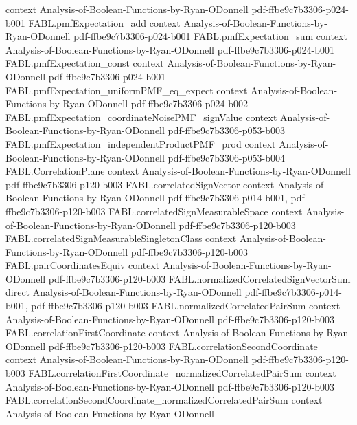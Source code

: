 \begin{theorem}
  {context}
  {Analysis-of-Boolean-Functions-by-Ryan-ODonnell}
  {pdf-ffbe9c7b3306-p024-b001}
\proofstep
  {FABL.pmfExpectation_add}
  {context}
  {Analysis-of-Boolean-Functions-by-Ryan-ODonnell}
  {pdf-ffbe9c7b3306-p024-b001}
\proofstep
  {FABL.pmfExpectation_sum}
  {context}
  {Analysis-of-Boolean-Functions-by-Ryan-ODonnell}
  {pdf-ffbe9c7b3306-p024-b001}
\proofstep
  {FABL.pmfExpectation_const}
  {context}
  {Analysis-of-Boolean-Functions-by-Ryan-ODonnell}
  {pdf-ffbe9c7b3306-p024-b001}
\proofstep
  {FABL.pmfExpectation_uniformPMF_eq_expect}
  {context}
  {Analysis-of-Boolean-Functions-by-Ryan-ODonnell}
  {pdf-ffbe9c7b3306-p024-b002}
\proofstep
  {FABL.pmfExpectation_coordinateNoisePMF_signValue}
  {context}
  {Analysis-of-Boolean-Functions-by-Ryan-ODonnell}
  {pdf-ffbe9c7b3306-p053-b003}
\proofstep
  {FABL.pmfExpectation_independentProductPMF_prod}
  {context}
  {Analysis-of-Boolean-Functions-by-Ryan-ODonnell}
  {pdf-ffbe9c7b3306-p053-b004}
\proofstep
  {FABL.CorrelationPlane}
  {context}
  {Analysis-of-Boolean-Functions-by-Ryan-ODonnell}
  {pdf-ffbe9c7b3306-p120-b003}
\proofstep
  {FABL.correlatedSignVector}
  {context}
  {Analysis-of-Boolean-Functions-by-Ryan-ODonnell}
  {pdf-ffbe9c7b3306-p014-b001,
    pdf-ffbe9c7b3306-p120-b003}
\proofstep
  {FABL.correlatedSignMeasurableSpace}
  {context}
  {Analysis-of-Boolean-Functions-by-Ryan-ODonnell}
  {pdf-ffbe9c7b3306-p120-b003}
\proofstep
  {FABL.correlatedSignMeasurableSingletonClass}
  {context}
  {Analysis-of-Boolean-Functions-by-Ryan-ODonnell}
  {pdf-ffbe9c7b3306-p120-b003}
\proofstep
  {FABL.pairCoordinatesEquiv}
  {context}
  {Analysis-of-Boolean-Functions-by-Ryan-ODonnell}
  {pdf-ffbe9c7b3306-p120-b003}
\proofstep
  {FABL.normalizedCorrelatedSignVectorSum}
  {direct}
  {Analysis-of-Boolean-Functions-by-Ryan-ODonnell}
  {pdf-ffbe9c7b3306-p014-b001,
    pdf-ffbe9c7b3306-p120-b003}
\proofstep
  {FABL.normalizedCorrelatedPairSum}
  {context}
  {Analysis-of-Boolean-Functions-by-Ryan-ODonnell}
  {pdf-ffbe9c7b3306-p120-b003}
\proofstep
  {FABL.correlationFirstCoordinate}
  {context}
  {Analysis-of-Boolean-Functions-by-Ryan-ODonnell}
  {pdf-ffbe9c7b3306-p120-b003}
\proofstep
  {FABL.correlationSecondCoordinate}
  {context}
  {Analysis-of-Boolean-Functions-by-Ryan-ODonnell}
  {pdf-ffbe9c7b3306-p120-b003}
\proofstep
  {FABL.correlationFirstCoordinate_normalizedCorrelatedPairSum}
  {context}
  {Analysis-of-Boolean-Functions-by-Ryan-ODonnell}
  {pdf-ffbe9c7b3306-p120-b003}
\proofstep
  {FABL.correlationSecondCoordinate_normalizedCorrelatedPairSum}
  {context}
  {Analysis-of-Boolean-Functions-by-Ryan-ODonnell}

\end{theorem}

